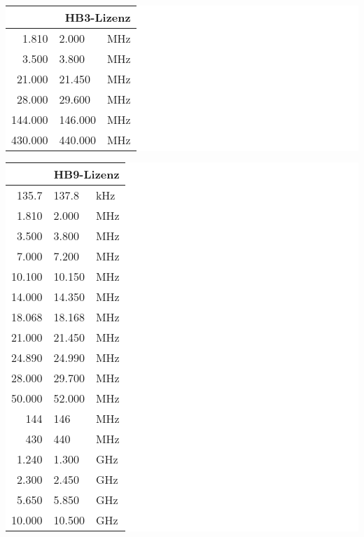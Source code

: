 \begin{minipage}[t]{\textwidth}
\colorbox{white}{
\begin{minipage}[t]{.45\textwidth}
\begin{tabular}{r @{---} l l}
\multicolumn{3}{r}{\bfseries HB3-Lizenz} \\ \toprule \arrayrulecolor{rowsep}
1.810 & 2.000 & MHz \\ \midrule
3.500 & 3.800 & MHz \\ \midrule
21.000 & 21.450 & MHz \\ \midrule
28.000 & 29.600 & MHz \\ \midrule
144.000 & 146.000 & MHz \\ \midrule
430.000 & 440.000 & MHz \\ \midrule
\end{tabular}
\end{minipage}
}
\colorbox{white}{
\begin{minipage}[t]{.45\textwidth}
\begin{tabular}{r @{---} l l}
\multicolumn{3}{r}{\bfseries HB9-Lizenz} \\ \toprule \arrayrulecolor{rowsep}
 135.7 & 137.8 & kHz \\ \midrule
1.810 & 2.000 & MHz \\ \midrule
3.500 & 3.800 & MHz \\ \midrule
7.000 & 7.200 & MHz \\ \midrule
10.100 & 10.150 & MHz \\ \midrule
14.000 & 14.350 & MHz \\ \midrule
18.068 & 18.168 & MHz \\ \midrule
21.000 & 21.450 & MHz \\ \midrule
24.890 & 24.990 & MHz \\ \midrule
28.000 & 29.700 & MHz \\ \midrule
50.000 & 52.000 & MHz \\ \midrule
144 & 146 & MHz \\ \midrule
430 & 440 & MHz \\ \midrule
1.240 & 1.300 & GHz \\ \midrule
2.300 & 2.450 & GHz \\ \midrule
5.650 & 5.850 & GHz \\ \midrule
10.000 & 10.500 & GHz \\ \midrule
\end{tabular}
\end{minipage}
}
\end{minipage}

